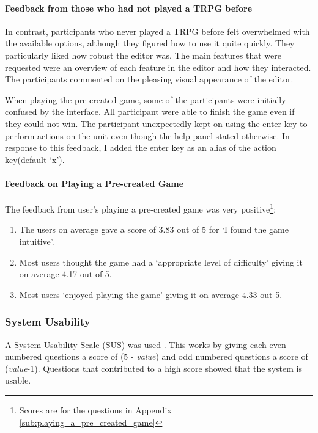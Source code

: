 \paragraph{Feedback from those who had not played a TRPG  before\\} 
In contrast, participants who never played a TRPG before felt overwhelmed with the available options, although they figured how to use it quite quickly.  They particularly liked how robust the editor was. The main features that were requested were  an overview of each feature in the editor and how they interacted.  The participants commented on the pleasing visual appearance of the editor.

When playing the pre-created game, some of the participants were initially confused by the interface. All participant were able to finish the game even if they could not win.  The participant unexpectedly kept on using the enter key to perform actions on the unit even though the help panel stated otherwise. In response to this feedback, I added the enter key as an alias of the action key(default `x').

\paragraph{Feedback on Playing  a Pre-created Game\\}
The feedback from user's playing a pre-created game was very positive\footnote{Scores are for the questions in Appendix \ref{sub:playing_a_pre_created_game}}:
\begin{enumerate}[topsep=2mm ]
	\item The users on average gave a score of 3.83 out of 5 for `I found the game intuitive'.
	\item Most users thought the game had a `appropriate level of difficulty' giving it on average 4.17 out of 5.
	\item Most users `enjoyed playing the game' giving it on average 4.33 out 5.
\end{enumerate}

\subsubsection{System Usability}
A System Usability Scale (SUS) was used \cite{SUS}. This works by giving each even numbered questions a score of (5 - \emph{value}) and odd numbered questions a score of (\emph{value}-1). Questions that contributed to a high score showed that the system is usable. 

